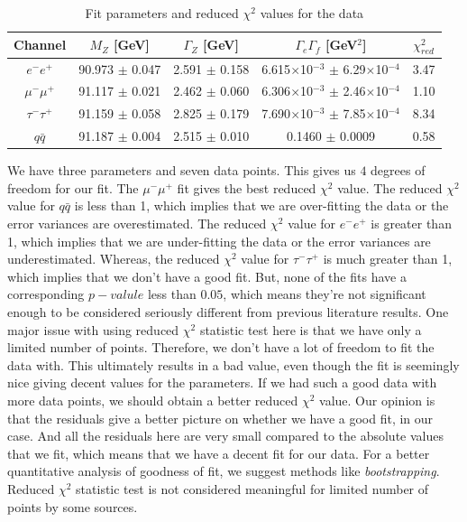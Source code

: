 \begin{table}[h!]
\centering
\begin{tabular}{c|cccc}
\hline
Channel        & $M_Z$ {[}GeV{]}    & $\Gamma_Z$ {[}GeV{]} & $\Gamma_e\Gamma_f$ {[}GeV$^2${]}                   & $\chi_{red}^2$ \\ \hline
$e^-e^+$       & 90.973 $\pm$ 0.047 & 2.591 $\pm$ 0.158    & 6.615$\times$10$^{-3}$ $\pm$ 6.29$\times$10$^{-4}$ & 3.47           \\
$\mu^-\mu^+$   & 91.117 $\pm$ 0.021 & 2.462 $\pm$ 0.060    & 6.306$\times$10$^{-3}$ $\pm$ 2.46$\times$10$^{-4}$ & 1.10           \\
$\tau^-\tau^+$ & 91.159 $\pm$ 0.058 & 2.825 $\pm$ 0.179    & 7.690$\times$10$^{-3}$ $\pm$ 7.85$\times$10$^{-4}$ & 8.34           \\
$q\bar{q}$     & 91.187 $\pm$ 0.004 & 2.515 $\pm$ 0.010    & 0.1460 $\pm$ 0.0009                                & 0.58          \\ \hline
\end{tabular}
\caption{Fit parameters and reduced $\chi^2$ values for the data}
\label{table:bwfit}
\end{table}
We have three parameters and seven data points. This gives us $4$ degrees of freedom for our fit. The $\mu^-\mu^+$ fit gives the best reduced $\chi^2$ value. The reduced $\chi^2$ value for $q\bar{q}$ is less than 1, which implies that we are over-fitting the data or the error variances are overestimated. The reduced $\chi^2$ value for $e^-e^+$ is greater than 1, which implies that we are under-fitting the data or the error variances are underestimated. Whereas, the reduced $\chi^2$ value for $\tau^-\tau^+$ is much greater than 1, which implies that we don't have a good fit\cite{bevington}. But, none of the fits have a corresponding $p-valule$ less than $0.05$, which means they're not significant enough to be considered seriously different from previous literature results\cite{pvalue}. One major issue with using reduced $\chi^2$ statistic test here is that we have only a limited number of points. Therefore, we don't have a lot of freedom to fit the data with. This ultimately results in a bad value, even though the fit is seemingly nice giving decent values for the parameters. If we had such a good data with more data points, we should obtain a better reduced $\chi^2$ value. Our opinion is that the residuals give a better picture on whether we have a good fit, in our case. And all the residuals here are very small compared to the absolute values that we fit, which means that we have a decent fit for our data. For a better quantitative analysis of goodness of fit, we suggest methods like \textit{bootstrapping}. Reduced $\chi^2$ statistic test is not considered meaningful for limited number of points by some sources\cite{andrae}.\\
